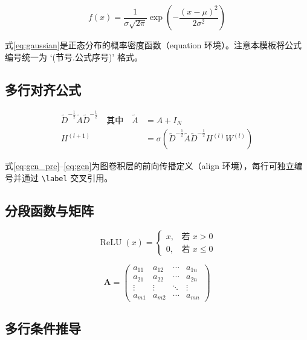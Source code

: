 \documentclass{harryopo-paper}
\begin{document}
\begin{equation}
f(x) = \frac{1}{\sigma\sqrt{2\pi}} \exp\left(-\frac{(x - \mu)^{2}}{2\sigma^{2}}\right)
\label{eq:gaussian}
\end{equation}

式\eqref{eq:gaussian}是正态分布的概率密度函数（equation 环境）。注意本模板将公式编号统一为 `(节号.公式序号)' 格式。

\subsection{多行对齐公式}

\begin{align}
\tilde{D}^{-\frac{1}{2}} \tilde{A} \tilde{D}^{-\frac{1}{2}} \quad\text{其中}\quad
\tilde{A} &= A + I_{N} \label{eq:gcn_pre}\\
H^{(l+1)} &= \sigma\!\left( \tilde{D}^{-\frac{1}{2}} \tilde{A} \tilde{D}^{-\frac{1}{2}} H^{(l)} W^{(l)} \right) \label{eq:gcn}
\end{align}

式\eqref{eq:gcn_pre}--\eqref{eq:gcn}为图卷积层的前向传播定义（align 环境），每行可独立编号并通过 \verb|\label| 交叉引用。

\subsection{分段函数与矩阵}

\begin{equation}
\operatorname{ReLU}(x) = \begin{cases}
x, & \text{若 } x > 0 \\
0, & \text{若 } x \leq 0
\end{cases}
\label{eq:relu}
\end{equation}

\begin{equation}
\mathbf{A} = \begin{pmatrix}
a_{11} & a_{12} & \cdots & a_{1n} \\
a_{21} & a_{22} & \cdots & a_{2n} \\
\vdots & \vdots & \ddots & \vdots \\
a_{m1} & a_{m2} & \cdots & a_{mn}
\end{pmatrix}
\label{eq:matrix}
\end{equation}

\subsection{多行条件推导}
\end{document}
